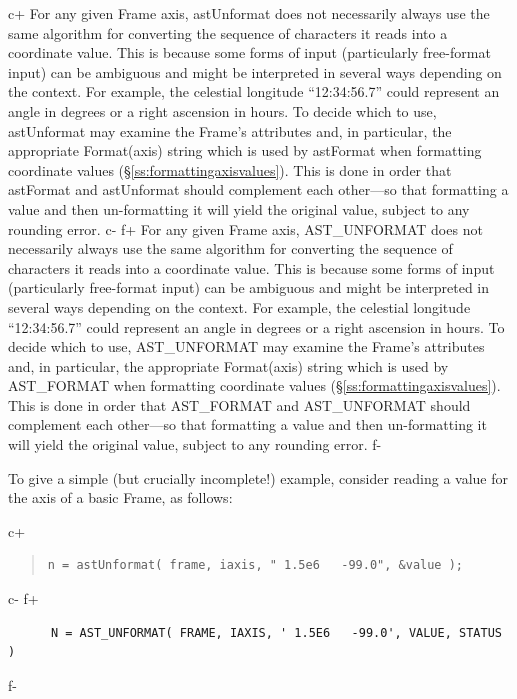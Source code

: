 \documentclass[twoside,11pt]{article}
\newcommand{\secref}[1]{\S\ref{#1}}
\newcommand{\secref}[1]{\ref{#1}}
\begin{document}
c+
For any given Frame axis, astUnformat does not necessarily always use
the same algorithm for converting the sequence of characters it reads
into a coordinate value. This is because some forms of input
(particularly free-format input) can be ambiguous and might be
interpreted in several ways depending on the context. For example, the
celestial longitude ``12:34:56.7'' could represent an angle in degrees
or a right ascension in hours. To decide which to use, astUnformat may
examine the Frame's attributes and, in particular, the appropriate
Format(axis) string which is used by astFormat when formatting
coordinate values (\secref{ss:formattingaxisvalues}). This is done in
order that astFormat and astUnformat should complement each other---so
that formatting a value and then un-formatting it will yield the
original value, subject to any rounding error.
c-
f+
For any given Frame axis, AST\_UNFORMAT does not necessarily always
use the same algorithm for converting the sequence of characters it
reads into a coordinate value. This is because some forms of input
(particularly free-format input) can be ambiguous and might be
interpreted in several ways depending on the context. For example, the
celestial longitude ``12:34:56.7'' could represent an angle in degrees
or a right ascension in hours. To decide which to use, AST\_UNFORMAT
may examine the Frame's attributes and, in particular, the appropriate
Format(axis) string which is used by AST\_FORMAT when formatting
coordinate values (\secref{ss:formattingaxisvalues}). This is done in
order that AST\_FORMAT and AST\_UNFORMAT should complement each
other---so that formatting a value and then un-formatting it will
yield the original value, subject to any rounding error.
f-

To give a simple (but crucially incomplete!) example, consider reading
a value for the axis of a basic Frame, as follows:

c+
\begin{quote}
\small
\begin{verbatim}
n = astUnformat( frame, iaxis, " 1.5e6   -99.0", &value );
\end{verbatim}
\normalsize
\end{quote}
c-
f+
\small
\begin{verbatim}
      N = AST_UNFORMAT( FRAME, IAXIS, ' 1.5E6   -99.0', VALUE, STATUS )
\end{verbatim}
\normalsize
f-
\end{document}
